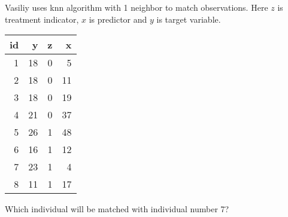 
\begin{question}
Vasiliy uses knn algorithm with 1 neighbor to match observations.
Here \(z\) is treatment indicator, \(x\) is predictor and \(y\) is target variable.

\begin{longtable}[]{@{}rrrr@{}}
\toprule()
id & y & z & x \\
\midrule()
\endhead
1 & 18 & 0 & 5 \\
2 & 18 & 0 & 11 \\
3 & 18 & 0 & 19 \\
4 & 21 & 0 & 37 \\
5 & 26 & 1 & 48 \\
6 & 16 & 1 & 12 \\
7 & 23 & 1 & 4 \\
8 & 11 & 1 & 17 \\
\bottomrule()
\end{longtable}

Which individual will be matched with individual number 7?
\end{question}


